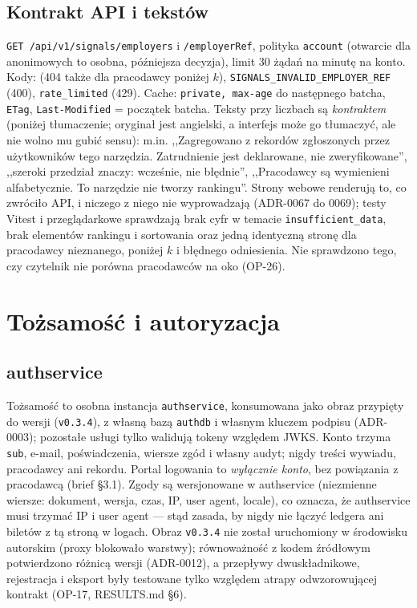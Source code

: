 \subsection{Kontrakt API i tekstów}

\texttt{GET /api/v1/signals/employers} i \texttt{/{employerRef}}, polityka
\texttt{account} (otwarcie dla anonimowych to osobna, późniejsza decyzja),
limit 30 żądań na minutę na konto. Kody:  (404
także dla pracodawcy poniżej $k$), \texttt{SIGNALS\_INVALID\_EMPLOYER\_REF}
(400), \texttt{rate\_limited} (429). Cache: \texttt{private, max-age} do
następnego batcha, \texttt{ETag}, \texttt{Last-Modified} = początek batcha.
Teksty przy liczbach są \emph{kontraktem} (poniżej tłumaczenie; oryginał jest angielski, a interfejs może go tłumaczyć, ale nie wolno mu gubić sensu): m.in. ,,Zagregowano z rekordów
zgłoszonych przez użytkowników tego narzędzia. Zatrudnienie jest deklarowane, nie
zweryfikowane'', ,,szeroki przedział znaczy: wcześnie, nie błędnie'', ,,Pracodawcy
są wymienieni alfabetycznie. To narzędzie nie tworzy rankingu''. Strony webowe
renderują to, co zwróciło API, i niczego z niego nie wyprowadzają (ADR-0067 do
0069); testy Vitest i przeglądarkowe sprawdzają brak cyfr w temacie
\texttt{insufficient\_data}, brak elementów rankingu i sortowania oraz jedną
identyczną stronę dla pracodawcy nieznanego, poniżej $k$ i błędnego odniesienia.
Nie sprawdzono tego, czy czytelnik nie porówna pracodawców na oko (OP-26).

\section{Tożsamość i autoryzacja}
\label{sec:p3-tozsamosc}

\subsection{authservice}

Tożsamość to osobna instancja \texttt{authservice}, konsumowana jako obraz
przypięty do wersji (\texttt{v0.3.4}), z własną bazą \texttt{authdb} i własnym
kluczem podpisu (ADR-0003); pozostałe usługi tylko walidują tokeny względem
JWKS. Konto trzyma \texttt{sub}, e-mail, poświadczenia, wiersze zgód i własny audyt;
nigdy treści wywiadu, pracodawcy ani rekordu. Portal logowania to \emph{wyłącznie
konto}, bez powiązania z pracodawcą (brief §3.1). Zgody są wersjonowane w
authservice (niezmienne wiersze: dokument, wersja, czas, IP, user agent, locale),
co oznacza, że authservice musi trzymać IP i user agent --- stąd zasada, by nigdy
nie łączyć ledgera ani biletów z tą stroną w logach. Obraz \texttt{v0.3.4} nie
został uruchomiony w środowisku autorskim (proxy blokowało warstwy); równoważność
z kodem źródłowym potwierdzono różnicą wersji (ADR-0012), a przepływy dwuskładnikowe,
rejestracja i eksport były testowane tylko względem atrapy odwzorowującej kontrakt
(OP-17, RESULTS.md §6).

